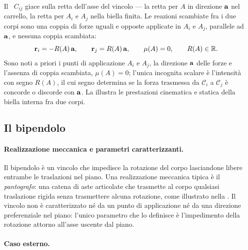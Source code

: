 




Il \CRr\ $C_{ij}$ giace sulla retta dell'asse del vincolo
--- la retta per $A$ in direzione $\mathbf{a}$ nel carrello, la
retta per $A_i$ e $A_j$ nella biella finita. Le reazioni
scambiate fra i due corpi sono una coppia di forze uguali
e opposte applicate in $A_i$ e $A_j$, parallele ad $\mathbf{a}$,
e nessuna coppia scambiata:
\begin{equation}\label{eq:reazione_carrello_int}
	\mathbf{r}_i = -R(A)\,\mathbf{a},
	\qquad
	\mathbf{r}_j = R(A)\,\mathbf{a},
	\qquad
	\mu(A) = 0,
	\qquad
	R(A) \in \mathbb{R}.
\end{equation}
Sono noti a priori i punti di applicazione $A_i$ e $A_j$,
la direzione $\mathbf{a}$ delle forze e l'assenza di coppia
scambiata, $\mu(A) = 0$; l'unica incognita scalare è
l'intensità con segno $R(A)$, il cui segno determina se
la forza trasmessa da $\mathcal{C}_i$ a $\mathcal{C}_j$
è concorde o discorde con $\mathbf{a}$. La
 illustra le prestazioni
cinematica e statica della biella interna fra due corpi.




\subsection{Il bipendolo}\label{sec:bipendolo}

\paragraph{Realizzazione meccanica e parametri caratterizzanti.}
Il bipendolo è un vincolo che impedisce la rotazione del corpo
lasciandone libere entrambe le traslazioni nel piano. Una
realizzazione meccanica tipica è il \emph{pantografo}: una
catena di aste articolate che trasmette al corpo qualsiasi
traslazione rigida senza trasmettere alcuna rotazione, come
illustrato nella . Il vincolo
non è caratterizzato né da un punto di applicazione né da una
direzione preferenziale nel piano: l'unico parametro che lo
definisce è l'impedimento della rotazione attorno all'asse
uscente dal piano.


\paragraph{Caso esterno.}

